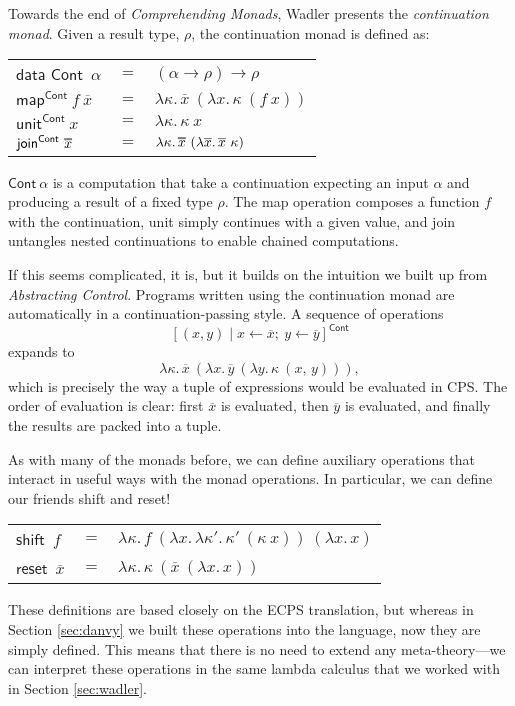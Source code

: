 \documentclass[acmsmall, nonacm, screen]{acmart}
\newcommand\doverline[1]{%
  \setbox0=\hbox{$\overline{#1}$}%
  \ht0=\dimexpr\ht0-.30ex\relax%
  \overline{\copy0}%
}
\newcommand{\lambdaE}[2]{\lambda #1.\, #2}
\newcommand{\map}[3]{\textsf{map}^{\textsf{#1}}~#2~#3}
\newcommand{\unit}[2]{\textsf{unit}^{\textsf{#1}}~#2}
\newcommand{\join}[2]{\textsf{join}^{\textsf{#1}}~#2}
\begin{document}
Towards the end of {\em Comprehending Monads}, Wadler presents the {\em continuation monad}.
Given a result type, $\rho$, the continuation monad is defined as:
\begin{center}
  \begin{tabular}{lll}
    $\textsf{data Cont}$~$\alpha$ & $=$ & $(\alpha \to \rho) \to \rho$ \\
    $\map{Cont}{f}{\overline{x}}$ & $=$ & $\lambdaE{\kappa}{\overline{x}~(\lambdaE{x}{\kappa~(f~x)})}$ \\
    $\unit{Cont}{x}$ & $=$ & $\lambdaE{\kappa}{\kappa~x}$ \\
    $\join{Cont}{\doverline{x}}$ & $=$ &
      $\lambdaE{\kappa}{\doverline{x}~(\lambdaE{\overline{x}}{\overline{x}~\kappa})}$
  \end{tabular}
\end{center}
$\textsf{Cont}~\alpha$ is a computation that take a continuation expecting an input $\alpha$ and
producing a result of a fixed type $\rho$. The \textsf{map} operation composes a function $f$
with the continuation, \textsf{unit} simply continues with a given value, and \textsf{join}
untangles nested continuations to enable chained computations.

If this seems complicated, it is, but it builds on the intuition we built up from {\em
Abstracting Control}. Programs written using the continuation monad are automatically in a
continuation-passing style. A sequence of operations
\[ [(x, y) \mid x \leftarrow \overline{x};\ y \leftarrow \overline{y}]^{\textsf{Cont}} \]
expands to
\[ \lambdaE{\kappa}{\overline{x}~(\lambdaE{x}{\overline{y}~(\lambdaE{y}{\kappa~(x,\, y)})})}, \]
which is precisely the way a tuple of expressions would be evaluated in CPS. The order of
evaluation is clear: first $\overline{x}$ is evaluated, then $\overline{y}$ is evaluated, and
finally the results are packed into a tuple.

As with many of the monads before, we can define auxiliary operations that interact in useful
ways with the monad operations. In particular, we can define our friends \textsf{shift} and
\textsf{reset}!
\begin{center}
  \begin{tabular}{lll}
    $\textsf{shift}$~$f$ & $=$ & $\lambdaE{\kappa}{f~(\lambdaE{x}{\lambdaE{\kappa'}{\kappa'~(\kappa~x)}})~(\lambdaE{x}{x})}$ \\
    $\textsf{reset}$~$\overline{x}$ & $=$ & $\lambdaE{\kappa}{\kappa~(\overline{x}~(\lambdaE{x}{x}))}$
  \end{tabular}
\end{center}
These definitions are based closely on the ECPS translation, but whereas in Section
\ref{sec:danvy} we built these operations into the language, now they are simply defined. This
means that there is no need to extend any meta-theory---we can interpret these operations in the
same lambda calculus that we worked with in Section \ref{sec:wadler}.
\end{document}
